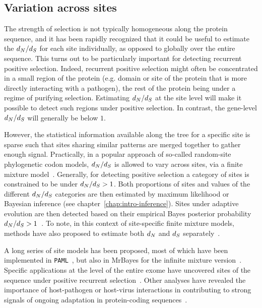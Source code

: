 \subsection{Variation across sites}
\label{subsec:variation-across-sites}

The strength of selection is not typically homogeneous along the protein sequence, and it has been rapidly recognized that it could be useful to estimate the $d_N / d_S$ for each site individually, as opposed to globally over the entire sequence.
This turns out to be particularly important for detecting recurrent positive selection.
Indeed, recurrent positive selection might often be concentrated in a small region of the protein (e.g. domain or site of the protein that is more directly interacting with a pathogen), the rest of the protein being under a regime of purifying selection.
Estimating $d_N / d_S$ at the site level will make it possible to detect such regions under positive selection.
In contrast, the gene-level $d_N / d_S$ will generally be below $1$.

However, the statistical information available along the tree for a specific site is sparse such that sites sharing similar patterns are merged together to gather enough signal.
Practically, in a popular approach of so-called random-site phylogenetic codon models, $d_N / d_S$ is allowed to vary across sites, via a finite mixture model~\citep{Nielsen1998, Yang2000, Yang2005, Huelsenbeck2006}.
Generally, for detecting positive selection a category of sites is constrained to be under $d_N / d_S > 1$.
Both proportions of sites and values of the different $d_N / d_S$ categories are then estimated by maximum likelihood or Bayesian inference (see chapter~\ref{chap:intro-inference}).
Sites under adaptive evolution are then detected based on their empirical Bayes posterior probability $d_N / d_S > 1$~\citep{Huelsenbeck2004,Yang2005}.
To note, in this context of site-specific finite mixture models, methods have also proposed to estimate both $d_N$ and $d_S$ separately~\citep{Pond2005a, Spielman2016}.

A long series of site models has been proposed, most of which have been implemented in \texttt{PAML}~\citep{Yang1997a,Yang2007}, but also in MrBayes for the infinite mixture version~\citep{Huelsenbeck2001, Ronquist2012}.
Specific applications at the level of the entire exome have uncovered sites of the sequence under positive recurrent selection~\citep{kosiol_patterns_2008}.
Other analyses have revealed the importance of host-pathogen or host-virus interactions in contributing to strong signals of ongoing adaptation in protein-coding sequences~\citep{Enard2016}.


